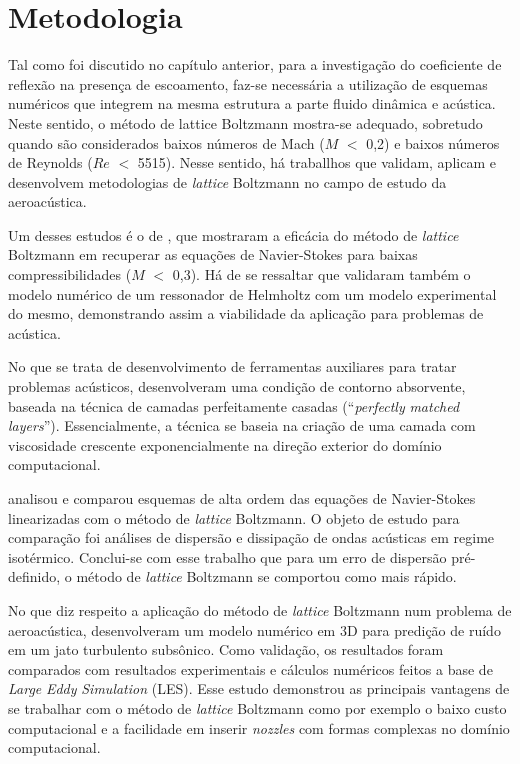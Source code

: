 \chapter{Metodologia}

Tal como foi discutido no capítulo anterior, para a investigação do coeficiente de reflexão na presença de escoamento, faz-se necessária a utilização de esquemas numéricos que integrem na mesma estrutura a parte fluido dinâmica e acústica. Neste sentido, o método de lattice Boltzmann mostra-se adequado, sobretudo quando são considerados baixos números de Mach ($M$ $<$ 0,2) e baixos números de Reynolds ($Re$ $<$ 5515). Nesse sentido, há traballhos que validam, aplicam e desenvolvem metodologias de \textit{lattice} Boltzmann no campo de estudo da aeroacústica.

Um desses estudos é o de , que mostraram a eficácia do método de \textit{lattice} Boltzmann em recuperar as equações de Navier-Stokes para baixas compressibilidades ($M$ $<$ 0,3). Há de se ressaltar que validaram também o modelo numérico de um ressonador de Helmholtz com um modelo experimental do mesmo, demonstrando assim a viabilidade da aplicação para problemas de acústica.

No que se trata de desenvolvimento de ferramentas auxiliares para tratar problemas acústicos,  desenvolveram uma condição de contorno absorvente, baseada na técnica de camadas perfeitamente casadas (``\textit{perfectly} \textit{matched} \textit{layers}''). Essencialmente, a técnica se baseia na criação de uma camada com viscosidade crescente exponencialmente na direção exterior do domínio computacional.

 analisou e comparou esquemas de alta ordem das equações de Navier-Stokes linearizadas com o método de \textit{lattice} Boltzmann. O objeto de estudo para comparação foi análises de dispersão e dissipação de ondas acústicas em regime isotérmico. Conclui-se com esse trabalho que para um erro de dispersão pré-definido, o método de \textit{lattice} Boltzmann se comportou como mais rápido.

No que diz respeito a aplicação do método de \textit{lattice} Boltzmann num problema de aeroacústica,  desenvolveram um modelo numérico em 3D para predição de ruído em um jato turbulento subsônico. Como validação, os resultados foram comparados com resultados experimentais e cálculos numéricos feitos a base de \textit{Large} \textit{Eddy} \textit{Simulation} (LES). Esse estudo demonstrou as principais vantagens de se trabalhar com o método de \textit{lattice} Boltzmann como por exemplo o baixo custo computacional e a facilidade em inserir \textit{nozzles} com formas complexas no domínio computacional.

